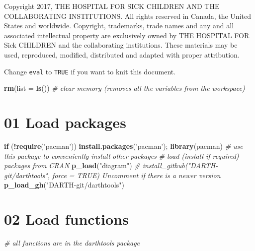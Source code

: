 \documentclass[
]{article}
\newenvironment{Shaded}{\begin{snugshade}}{\end{snugshade}}
\newcommand{\CommentTok}[1]{\textcolor[rgb]{0.56,0.35,0.01}{\textit{#1}}}
\newcommand{\ControlFlowTok}[1]{\textcolor[rgb]{0.13,0.29,0.53}{\textbf{#1}}}
\newcommand{\DataTypeTok}[1]{\textcolor[rgb]{0.13,0.29,0.53}{#1}}
\newcommand{\KeywordTok}[1]{\textcolor[rgb]{0.13,0.29,0.53}{\textbf{#1}}}
\newcommand{\NormalTok}[1]{#1}
\newcommand{\OperatorTok}[1]{\textcolor[rgb]{0.81,0.36,0.00}{\textbf{#1}}}
\newcommand{\StringTok}[1]{\textcolor[rgb]{0.31,0.60,0.02}{#1}}
\begin{document}
Copyright 2017, THE HOSPITAL FOR SICK CHILDREN AND THE COLLABORATING
INSTITUTIONS. All rights reserved in Canada, the United States and
worldwide. Copyright, trademarks, trade names and any and all associated
intellectual property are exclusively owned by THE HOSPITAL FOR Sick
CHILDREN and the collaborating institutions. These materials may be
used, reproduced, modified, distributed and adapted with proper
attribution.

\newpage

Change \texttt{eval} to \texttt{TRUE} if you want to knit this document.

\begin{Shaded}
\begin{Highlighting}[]
\KeywordTok{rm}\NormalTok{(}\DataTypeTok{list =} \KeywordTok{ls}\NormalTok{())      }\CommentTok{# clear memory (removes all the variables from the workspace)}
\end{Highlighting}
\end{Shaded}

\hypertarget{load-packages}{%
\section{01 Load packages}\label{load-packages}}

\begin{Shaded}
\begin{Highlighting}[]
\ControlFlowTok{if}\NormalTok{ (}\OperatorTok{!}\KeywordTok{require}\NormalTok{(}\StringTok{'pacman'}\NormalTok{)) }\KeywordTok{install.packages}\NormalTok{(}\StringTok{'pacman'}\NormalTok{); }\KeywordTok{library}\NormalTok{(pacman) }\CommentTok{# use this package to conveniently install other packages}
\CommentTok{# load (install if required) packages from CRAN}
\KeywordTok{p_load}\NormalTok{(}\StringTok{"diagram"}\NormalTok{) }
\CommentTok{# install_github("DARTH-git/darthtools", force = TRUE) Uncomment if there is a newer version}
\KeywordTok{p_load_gh}\NormalTok{(}\StringTok{"DARTH-git/darthtools"}\NormalTok{)}
\end{Highlighting}
\end{Shaded}

\hypertarget{load-functions}{%
\section{02 Load functions}\label{load-functions}}

\begin{Shaded}
\begin{Highlighting}[]
\CommentTok{# all functions are in the darthtools package}
\end{Highlighting}
\end{Shaded}
\end{document}
